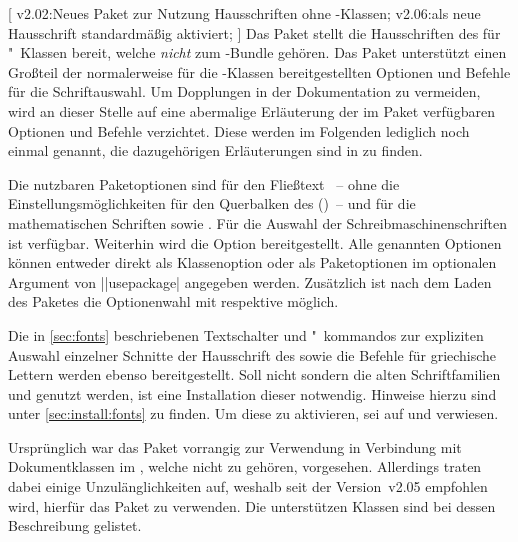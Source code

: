 \begin{DeclareEntity}{}[%
  v2.02:Neues Paket zur Nutzung Hausschriften ohne \TUDScript-Klassen;%
  v2.06:\OpenSans als neue Hausschrift standardmäßig aktiviert;%
]
%
Das Paket  stellt die Hausschriften des \TUDCDs für 
"~Klassen bereit, welche \emph{nicht} zum \TUDScript-Bundle 
gehören. Das Paket unterstützt einen Großteil der normalerweise für die 
\TUDScript-Klassen bereitgestellten Optionen und Befehle für die 
Schriftauswahl. Um Dopplungen in der Dokumentation zu vermeiden, wird an dieser 
Stelle auf eine abermalige Erläuterung der im Paket  
verfügbaren Optionen und Befehle verzichtet. Diese werden im Folgenden 
lediglich noch einmal genannt, die dazugehörigen Erläuterungen sind in 
 zu finden.

Die nutzbaren Paketoptionen sind für den Fließtext ~-- ohne die 
Einstellungsmöglichkeiten für den Querbalken des \CDs ()~-- und 
für die mathematischen Schriften  sowie . 
Für die Auswahl der Schreibmaschinenschriften ist  verfügbar. 
Weiterhin wird die Option  bereitgestellt. Alle genannten 
Optionen können entweder direkt als Klassenoption oder als Paketoptionen im 
optionalen Argument von 
\Macro||{usepackage|} angegeben 
werden. Zusätzlich ist nach dem Laden des Paketes die Optionenwahl mit 
 respektive  möglich.

Die in \autoref{sec:fonts} beschriebenen Textschalter und "~kommandos zur 
expliziten Auswahl einzelner Schnitte der Hausschrift des \CDs sowie die 
Befehle für griechische Lettern werden ebenso bereitgestellt.
%
Soll nicht \OpenSans sondern die alten Schriftfamilien \Univers und \DIN 
genutzt werden, ist eine Installation dieser notwendig. Hinweise hierzu sind 
unter \autoref{sec:install:fonts} zu finden. Um diese zu aktivieren, sei auf 
 und  verwiesen.

%
Ursprünglich war das Paket  vorrangig zur Verwendung in 
Verbindung mit Dokumentklassen im \TUDCD, welche nicht zu \TUDScript gehören, 
vorgesehen. Allerdings traten dabei einige Unzulänglichkeiten auf, weshalb seit 
der Version~v2.05 empfohlen wird, hierfür das Paket  
zu verwenden. Die unterstützen Klassen sind bei dessen Beschreibung gelistet. 
\end{DeclareEntity}




